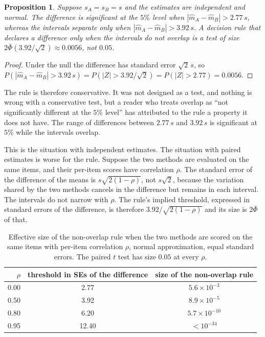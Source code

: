 \documentclass[11pt]{article}
\newtheorem{proposition}{Proposition}
\theoremstyle{definition}
\begin{document}
\begin{proposition}
Suppose $s_A=s_B=s$ and the estimates are independent and normal. The difference is significant at the $5\%$ level when $|\hat m_A-\hat m_B|>2.77\,s$, whereas the intervals separate only when $|\hat m_A-\hat m_B|>3.92\,s$. A decision rule that declares a difference only when the intervals do not overlap is a test of size $2\bar\Phi(3.92/\sqrt2)\approx0.0056$, not $0.05$.
\end{proposition}

\begin{proof}
Under the null the difference has standard error $\sqrt2\,s$, so $P(|\hat m_A-\hat m_B|>3.92\,s)=P(|Z|>3.92/\sqrt2)=P(|Z|>2.77)=0.0056$. \qedhere
\end{proof}

The rule is therefore conservative. It was not designed as a test, and nothing is wrong with a conservative test, but a reader who treats overlap as ``not significantly different at the $5\%$ level'' has attributed to the rule a property it does not have. The range of differences between $2.77\,s$ and $3.92\,s$ is significant at $5\%$ while the intervals overlap.

This is the situation with independent estimates. The situation with paired estimates is worse for the rule. Suppose the two methods are evaluated on the same items, and their per-item scores have correlation $\rho$. The standard error of the difference of the means is $s\sqrt{2(1-\rho)}$, not $s\sqrt2$, because the variation shared by the two methods cancels in the difference but remains in each interval. The intervals do not narrow with $\rho$. The rule's implied threshold, expressed in standard errors of the difference, is therefore $3.92/\sqrt{2(1-\rho)}$ and its size is $2\bar\Phi$ of that.

\begin{table}[t]
\centering
\caption{Effective size of the non-overlap rule when the two methods are scored on the same items with per-item correlation $\rho$, normal approximation, equal standard errors. The paired $t$ test has size $0.05$ at every $\rho$.}
\begin{tabular}{rcc}
\toprule
$\rho$ & threshold in SEs of the difference & size of the non-overlap rule \\
\midrule
0.00 & 2.77  & $5.6\times10^{-3}$ \\
0.50 & 3.92  & $8.9\times10^{-5}$ \\
0.80 & 6.20  & $5.7\times10^{-10}$ \\
0.95 & 12.40 & $<10^{-34}$ \\
\bottomrule
\end{tabular}
\end{table}
\end{document}
